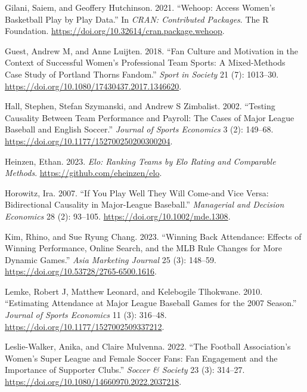 \documentclass[
  letterpaper,
  DIV=11,
  numbers=noendperiod]{scrartcl}
\newlength{\cslhangindent}
\newenvironment{CSLReferences}[2] %
 {\begin{list}{}{%
  \setlength{\itemindent}{0pt}
  \setlength{\leftmargin}{0pt}
  \setlength{\parsep}{0pt}
  \ifodd #1
   \setlength{\leftmargin}{\cslhangindent}
   \setlength{\itemindent}{-1\cslhangindent}
  \fi
  \setlength{\itemsep}{#2\baselineskip}}}
 {\end{list}}
\begin{document}
\begin{CSLReferences}{1}{1}
Gilani, Saiem, and Geoffery Hutchinson. 2021. {``Wehoop: Access Women's
Basketball Play by Play Data.''} In \emph{CRAN: Contributed Packages}.
The R Foundation. \url{https://doi.org/10.32614/cran.package.wehoop}.

Guest, Andrew M, and Anne Luijten. 2018. {``Fan Culture and Motivation
in the Context of Successful Women's Professional Team Sports: A
Mixed-Methods Case Study of Portland Thorns Fandom.''} \emph{Sport in
Society} 21 (7): 1013--30.
\url{https://doi.org/10.1080/17430437.2017.1346620}.

Hall, Stephen, Stefan Szymanski, and Andrew S Zimbalist. 2002.
{``Testing Causality Between Team Performance and Payroll: The Cases of
Major League Baseball and English Soccer.''} \emph{Journal of Sports
Economics} 3 (2): 149--68.
\url{https://doi.org/10.1177/152700250200300204}.

Heinzen, Ethan. 2023. \emph{Elo: Ranking Teams by Elo Rating and
Comparable Methods}. \url{https://github.com/eheinzen/elo}.

Horowitz, Ira. 2007. {``If You Play Well They Will Come-and Vice Versa:
Bidirectional Causality in Major-League Baseball.''} \emph{Managerial
and Decision Economics} 28 (2): 93--105.
\url{https://doi.org/10.1002/mde.1308}.

Kim, Rhino, and Sue Ryung Chang. 2023. {``Winning Back Attendance:
Effects of Winning Performance, Online Search, and the MLB Rule Changes
for More Dynamic Games.''} \emph{Asia Marketing Journal} 25 (3):
148--59. \url{https://doi.org/10.53728/2765-6500.1616}.

Lemke, Robert J, Matthew Leonard, and Kelebogile Tlhokwane. 2010.
{``Estimating Attendance at Major League Baseball Games for the 2007
Season.''} \emph{Journal of Sports Economics} 11 (3): 316--48.
\url{https://doi.org/10.1177/1527002509337212}.

Leslie-Walker, Anika, and Claire Mulvenna. 2022. {``The Football
Association's Women's Super League and Female Soccer Fans: Fan
Engagement and the Importance of Supporter Clubs.''} \emph{Soccer \&
Society} 23 (3): 314--27.
\url{https://doi.org/10.1080/14660970.2022.2037218}.


\end{CSLReferences}
\end{document}
